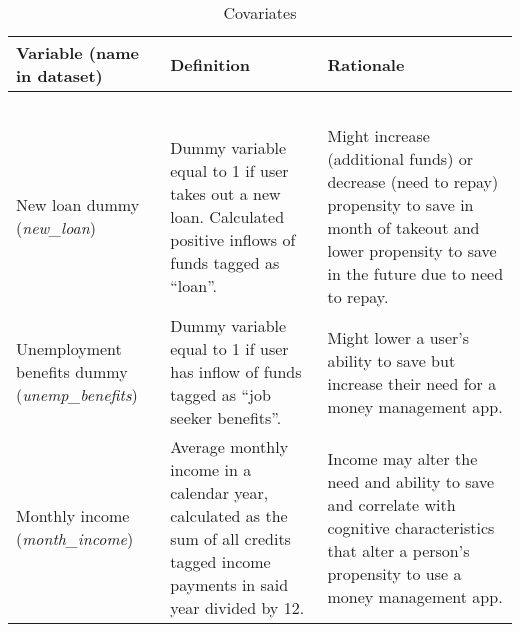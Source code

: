 \begin{table}[htpb]
    \centering\scriptsize
    \caption{Covariates}
    \label{tab:vars}
    \begin{tabularx}{\textwidth}{>{\raggedright\arraybackslash}X
        >{\raggedright\arraybackslash}X>{\raggedright\arraybackslash}X}
    \hline\hline
    Variable (name in dataset) & Definition  & Rationale \\
    \hline\\
    \multicolumn{3}{c}{\textbf{Primary outcome}}\\\\

    \multicolumn{3}{c}{\textbf{Covariates}}\\\\

    New loan dummy (\textit{new\_loan})&
    Dummy variable equal to 1 if user takes out a new loan. Calculated positive inflows
    of funds tagged as ``loan''.&
    Might increase (additional funds) or decrease (need to repay) propensity to
    save in month of takeout and lower propensity to save in the future due to
    need to repay.\\

    Unemployment benefits dummy (\textit{unemp\_benefits})&
    Dummy variable equal to 1 if user has inflow of funds tagged as ``job
    seeker benefits''.&
    Might lower a user's ability to save but increase their need for a money
    management app.\\

    Monthly income (\textit{month\_income})&
    Average monthly income in a calendar year, calculated as the sum of all
    credits tagged income payments in said year divided by 12.&
    Income may alter the need and ability to save and correlate with cognitive
    characteristics that alter a person's propensity to use a money management
    app.\\

    \hline\hline
    \end{tabularx}
\end{table}

